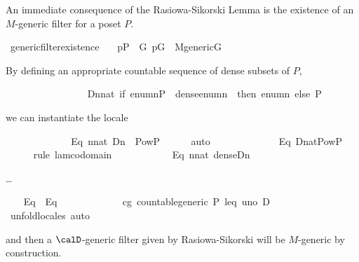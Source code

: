 An immediate consequence of the Rasiowa-Sikorski Lemma is the
existence of an $M$-generic filter for a poset $P$.

\begin{isabellebody}
\isanewline
{}\isamarkupfalse%
\ generic{\isacharunderscore}filter{\isacharunderscore}existence{\isacharcolon}\ \isanewline
\ \ {\isachardoublequoteopen}p{\isasymin}P\ {\isasymLongrightarrow}\ {\isasymexists}G{\isachardot}\ p{\isasymin}G\ {\isasymand}\ M{\isacharunderscore}generic{\isacharparenleft}G{\isacharparenright}{\isachardoublequoteclose}\isanewline
\end{isabellebody}

By defining an appropriate countable sequence of dense subsets of $P$,
\begin{isabellebody}
\isanewline
\ \ \isamarkupfalse%
\isanewline
\ \ \ \ \ \ \ \ \ \ \ \ \ \ {\isacharquery}D{\isacharequal}{\isachardoublequoteopen}{\isasymlambda}n{\isasymin}nat{\isachardot}\ {\isacharparenleft}if\ {\isacharparenleft}enum{\isacharbackquote}n{\isasymsubseteq}P\ {\isasymand}\ dense{\isacharparenleft}enum{\isacharbackquote}n{\isacharparenright}{\isacharparenright}\ \ then\ enum{\isacharbackquote}n\ else\ P{\isacharparenright}{\isachardoublequoteclose}\isanewline
\end{isabellebody}
\noindent we can instantiate the locale 

\begin{isabellebody}
\isanewline
\ \ \isamarkupfalse%
\ \isanewline
\ \ \ \ \ \ \ \ \ Eq{}{\isacharcolon}\ {\isachardoublequoteopen}{\isasymforall}n{\isasymin}nat{\isachardot}\ {\isacharquery}D{\isacharbackquote}n\ {\isasymin}\ Pow{\isacharparenleft}P{\isacharparenright}{\isachardoublequoteclose}\isanewline
\ \ \ \ \isamarkupfalse%
\ auto\isanewline
\ \ \isamarkupfalse%
\ \isamarkupfalse%
\isanewline
\ \ \ \ \ \ \ \ \ Eq{}{\isacharcolon}\ {\isachardoublequoteopen}{\isacharquery}D{\isacharcolon}nat{\isasymrightarrow}Pow{\isacharparenleft}P{\isacharparenright}{\isachardoublequoteclose}\isanewline
\ \ \ \ \isamarkupfalse%
\ {\isacharparenleft}rule\ lam{\isacharunderscore}codomain{\isacharparenright}\isanewline
\ \ \isamarkupfalse%
\isanewline
\ \ \ \ \ \ \ \ \ Eq{}{\isacharcolon}\ {\isachardoublequoteopen}{\isasymforall}n{\isasymin}nat{\isachardot}\ dense{\isacharparenleft}{\isacharquery}D{\isacharbackquote}n{\isacharparenright}{\isachardoublequoteclose}
\end{isabellebody}
\dots
\begin{isabellebody}
\isanewline
\ \ \isamarkupfalse%
\ Eq{}\ \ Eq{}\ \isamarkupfalse%
\ \isanewline
\ \ \ \ \ \ \ \ \ \ cg{\isacharcolon}\ countable{\isacharunderscore}generic\ P\ leq\ uno\ {\isacharquery}D\ \isanewline
\ \ \ \ \isamarkupfalse%
\ {\isacharparenleft}unfold{\isacharunderscore}locales{\isacharcomma}\ auto{\isacharparenright}\isanewline
\end{isabellebody}
\noindent
and then a  $\calD$-generic filter given by Rasiowa-Sikorski will be $M$-generic by construction. 

